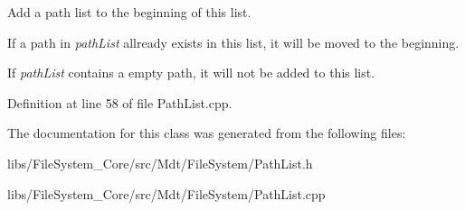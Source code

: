Add a path list to the beginning of this list. 

If a path in {\itshape path\+List} allready exists in this list, it will be moved to the beginning.

If {\itshape path\+List} contains a empty path, it will not be added to this list. 

Definition at line 58 of file Path\+List.\+cpp.



The documentation for this class was generated from the following files\+:\begin{DoxyCompactItemize}
\item 
libs/\+File\+System\+\_\+\+Core/src/\+Mdt/\+File\+System/Path\+List.\+h\item 
libs/\+File\+System\+\_\+\+Core/src/\+Mdt/\+File\+System/Path\+List.\+cpp\end{DoxyCompactItemize}
